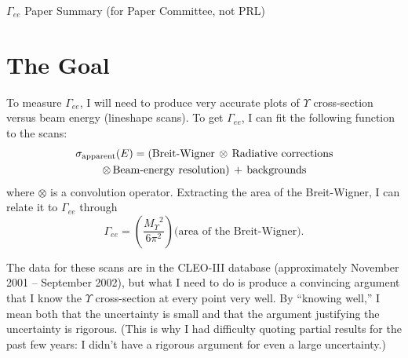 \documentclass[12pt]{article}
\begin{document}
\newcommand{\subs}[1]{{\mbox{\scriptsize #1}}}
\newcommand{\inputfile}[1]{\noindent {\bf Filename: #1} \setlength{\baselineskip}{0 cm}  \normalspacing \vspace{0.5 cm}}
\newcommand{\inputfilenoname}[1]{\noindent \setlength{\baselineskip}{0 cm}  \normalspacing \vspace{0.5 cm}}

\newcommand{\dxy}{$d_{XY}$}
\newcommand{\dz}{$d_Z$}
\newcommand{\pone}{$|\vec{p}_1|$}
\newcommand{\ptwo}{$|\vec{p}_2|$}
\newcommand{\eone}{$E_1$}
\newcommand{\etwo}{$E_2$}
\newcommand{\ethree}{$E_3$}
\newcommand{\eisr}{$E_{\mbox{\scriptsize ISR}}$}
\newcommand{\visen}{$E_{\mbox{\scriptsize vis}}$}
\newcommand{\hotvisen}{$E_{\mbox{\scriptsize vis}}^{\mbox{\scriptsize hot}}$}
\newcommand{\lfourdec}{L4$_{\mbox{\scriptsize dec}}$}
\newcommand{\pdotp}{$|\vec{p}_1\cdot\vec{p}_2|$}
\newcommand{\ebeam}{$E_{\mbox{\scriptsize beam}}$}
\newcommand{\ecom}{$E_{\mbox{\scriptsize COM}}$}
\newcommand{\pz}{$\sum p_z$}

\newcommand{\scosmic}{$s_{\mbox{\scriptsize cosmic}}$}

\begin{center}
  \Huge $\Gamma_{ee}$ Paper Summary (for Paper Committee, not PRL)
\end{center}

\section{The Goal}

To measure $\Gamma_{ee}$, I will need to produce very accurate plots
of $\Upsilon$ cross-section versus beam energy (lineshape scans).  To
get $\Gamma_{ee}$, I can fit the following function to the scans:
\begin{multline}
  \sigma_\subs{apparent}(E) = (\mbox{Breit-Wigner} \, \otimes \,
  \mbox{Radiative corrections} \\ \otimes \, \mbox{Beam-energy
  resolution}) \, + \, \mbox{backgrounds}
\end{multline}
where $\otimes$ is a convolution operator.  Extracting the area of the
Breit-Wigner, I can relate it to $\Gamma_{ee}$ through
\begin{equation}
  \Gamma_{ee} = \left(\frac{{M_\Upsilon}^2}{6 \pi^2}\right)
  \mbox{(area of the Breit-Wigner).}
\end{equation}

The data for these scans are in the CLEO-III database (approximately
November 2001 -- September 2002), but what I need to do is produce a
convincing argument that I know the $\Upsilon$ cross-section at every
point very well.  By ``knowing well,'' I mean both that the
uncertainty is small and that the argument justifying the uncertainty
is rigorous.  (This is why I had difficulty quoting partial results
for the past few years: I didn't have a rigorous argument for even a
large uncertainty.)
\end{document}
